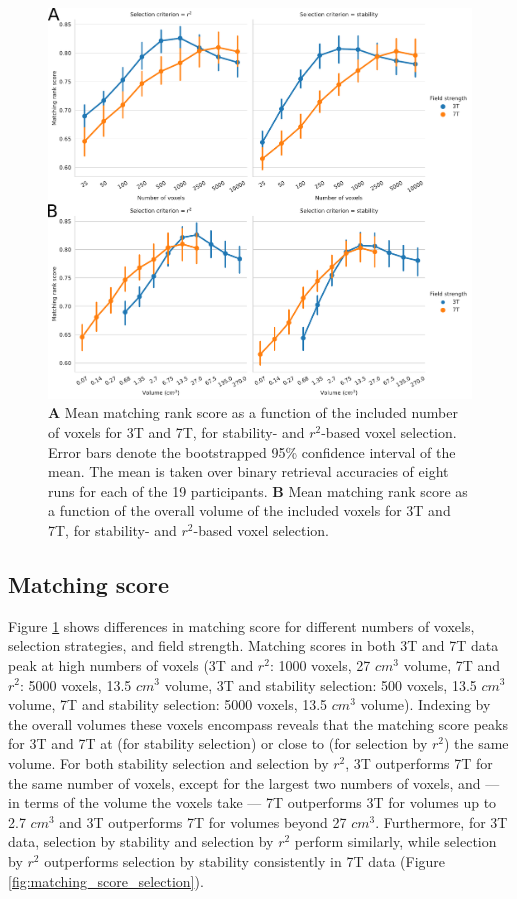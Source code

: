 \begin{figure}
  \centering
    \includegraphics[width=\linewidth]{pics/rank.pdf}
	
  \caption{\textbf{A} Mean matching rank score as a function of the included number
  of voxels for 3T and 7T, for stability- and $r^2$-based voxel selection.
  Error bars denote the bootstrapped 95\% confidence interval of the mean. The
  mean is taken over binary retrieval accuracies of eight runs for each of the
  19 participants. \textbf{B} Mean matching rank score as a function of the overall
volume of the included voxels for 3T and 7T, for stability- and
$r^2$-based voxel selection.}

 \label{fig:matching_score}
\end{figure}

\subsection*{Matching score}

Figure \ref{fig:matching_score} shows differences in matching score for different numbers of voxels, selection strategies, and field strength. Matching scores in both 3T and 7T data peak at high numbers of voxels (3T and $r^{2}$: 1000 voxels, 27 $cm^{3}$ volume, 7T and $r^{2}$: 5000 voxels, 13.5 $cm^{3}$ volume, 3T and stability selection: 500 voxels, 13.5 $cm^{3}$ volume, 7T and stability selection: 5000 voxels, 13.5 $cm^{3}$ volume). Indexing by the overall volumes these voxels encompass reveals that the matching score peaks for 3T and 7T at (for stability selection) or close to (for selection by $r^{2}$) the same volume. For both stability selection and selection by $r^{2}$, 3T outperforms 7T for the same number of voxels, except for the largest two numbers of voxels, and --- in terms of the volume the voxels take --- 7T outperforms 3T for volumes up to 2.7 $cm^{3}$ and 3T outperforms 7T for volumes beyond 27 $cm^{3}$. Furthermore, for 3T data, selection by stability and selection by $r^{2}$ perform similarly, while selection by $r^{2}$ outperforms selection by stability consistently in 7T data (Figure \ref{fig:matching_score_selection}).

